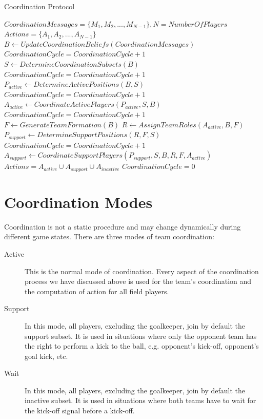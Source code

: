 \begin{algorithm}[ht!]
\caption{Coordination Protocol }
\label{CoordinationAlgorithm}
\begin{algorithmic}[1]
\begin{small}
$Coordination Messages = \lbrace M_{1},M_{2},...,M_{N-1} \rbrace, N = Number Of Players $
$Actions = \lbrace A_{1},A_{2},...,A_{N-1} \rbrace$
\STATE
{}
\STATE $B \leftarrow Update Coordination Beliefs(Coordination Messages) $
\STATE $CoordinationCycle = CoordinationCycle + 1$
\STATE $S \leftarrow Determine Coordination Subsets(B) $
\STATE $CoordinationCycle = CoordinationCycle + 1$
\STATE $P_{active} \leftarrow Determine Active Positions(B,S) $
\STATE $CoordinationCycle = CoordinationCycle + 1$
\STATE $A_{active} \leftarrow Coordinate Active Players(P_{active},S,B) $
\STATE $CoordinationCycle = CoordinationCycle + 1$
\STATE $ F \leftarrow Generate Team Formation(B) $
\STATE $ R \leftarrow Assign Team Roles(A_{active},B,F) $
\STATE $ P_{support} \leftarrow Determine Support Positions(R,F,S) $
\STATE $CoordinationCycle = CoordinationCycle + 1$
\STATE $A_{support} \leftarrow Coordinate Support Players(P_{support},S,B,R,F,A_{active}) $
\STATE $Actions = A_{active} \cup A_{support} \cup A_{inactive}$
\STATE $CoordinationCycle = 0$
\ENDIF
\end{small}
\end{algorithmic}
\end{algorithm}


\section{Coordination Modes}

Coordination is not a static procedure and may change dynamically during different game states. There are three modes of team coordination:
\begin{description}
\item[Active] This is the normal mode of coordination. Every aspect of the coordination process we have discussed above is used for the team's coordination and the computation of action for all field players.
\item[Support] In this mode, all players, excluding the goalkeeper, join by default the support subset. It is used in situations where only the opponent team has the right to perform a kick to the ball, e.g. opponent's kick-off,  opponent's goal kick, etc.
\item[Wait] In this mode, all players, excluding the goalkeeper, join by default the inactive subset. It is used in situations where both teams have to wait for the kick-off signal before a kick-off.
\end{description}



